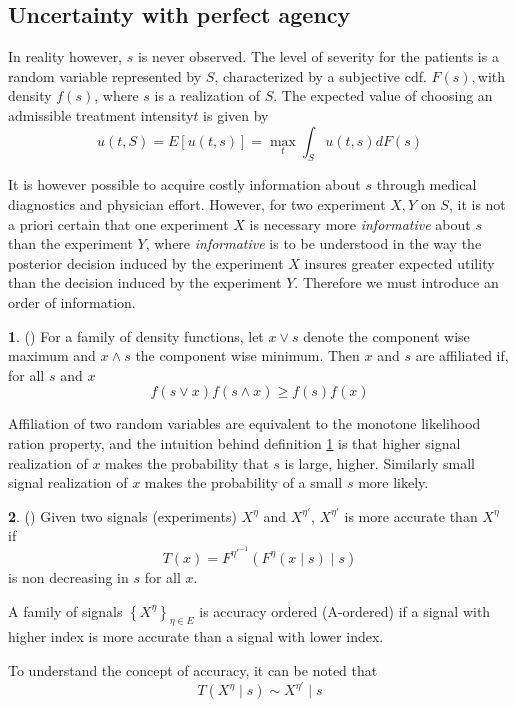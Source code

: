 \documentclass[10pt,english,paper=a4,fontsize=10pt]{scrartcl}
\theoremstyle{definition}
\newtheorem{defn}{\protect\definitionname}
\theoremstyle{plain}
\theoremstyle{definition}
\providecommand{\definitionname}{Definition}
\begin{document}
\subsection{Uncertainty with perfect agency}

In reality however, $s$ is never observed. The level of severity
for the patients is a random variable represented by $S$, characterized
by a subjective cdf. $F(s),$with density $f(s)$, where $s$ is a
realization of $S$. The expected value of choosing an admissible
treatment intensity$t$ is given by 
\begin{equation}
u(t,S)=E[u(t,s)]=\max_{t}\int_{S}u(t,s)dF(s)\label{eq:expected-utility-prior}
\end{equation}


It is however possible to acquire costly information about $s$ through
medical diagnostics and physician effort. However, for two experiment
$X,Y$ on $S$, it is not a priori certain that one experiment $X$
is necessary more \emph{informative} about $s$ than the experiment
$Y$, where \emph{informative} is to be understood in the way the
posterior decision induced by the experiment $X$ insures greater
expected utility than the decision induced by the experiment $Y$.
Therefore we must introduce an order of information. 
\begin{defn}
\label{def:afflilation}(\cite{Milgrom1982}) For a family of density
functions, let $x\lor s$ denote the component wise maximum and $x\land s$
the component wise minimum. Then $x$ and $s$ are affiliated if,
for all $s$ and $x$
\[
f(s\lor x)f(s\land x)\ge f(s)f(x)
\]

\end{defn}
Affiliation of two random variables are equivalent to the monotone
likelihood ration property, and the intuition behind definition \ref{def:afflilation}
is that higher signal realization of $x$ makes the probability that
$s$ is large, higher. Similarly small signal realization of $x$
makes the probability of a small $s$ more likely.
\begin{defn}
\label{def:accuracy}(\cite{Acquisition2000}) Given two signals (experiments)
$X^{\eta}$ and $X^{\eta'}$, $X^{\eta'}$ is more accurate than $X^{\eta}$
if 
\begin{equation}
T(x)=F^{\eta'^{-1}}(F^{\eta}(x\mid s)\mid s)\label{eq:acuracy tranformation}
\end{equation}
 is non decreasing in $s$ for all $x$.

A family of signals $\left\{ X^{\eta}\right\} _{\eta\in E}$ is accuracy
ordered (A-ordered) if a signal with higher index is more accurate
than a signal with lower index. 
\end{defn}
To understand the concept of accuracy, it can be noted that 
\[
T(X^{\eta}\mid s)\sim X^{\eta'}\mid s
\]
\end{document}

